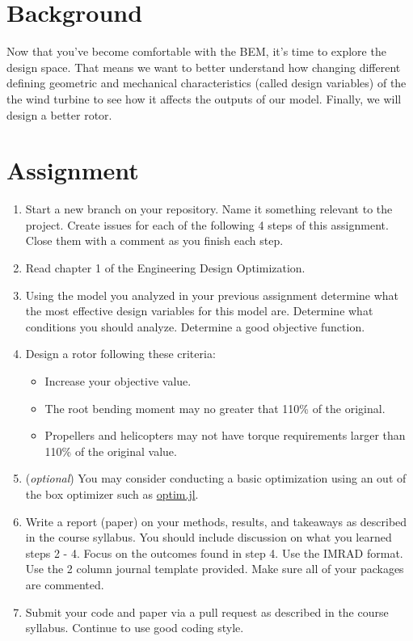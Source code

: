 \documentclass[12pt]{article}
\begin{document}
	
	\section{Background}
	
	Now that you've become comfortable with the BEM, it's time to explore the design space.
That means we want to better understand how changing different defining geometric and mechanical characteristics (called design variables) of the the wind turbine to see how it affects the outputs of our model. 
Finally, we will design a better rotor. 
	
	
	\section{Assignment}

	\begin{enumerate}
		\item Start a new branch on your repository. Name it something relevant to the project. Create issues for each of the following 4 steps of this assignment. Close them with a comment as you finish each step. 
		\item Read chapter 1 of the Engineering Design Optimization. 
		\item Using the model you analyzed in your previous assignment determine what the most effective design variables for this model are. Determine what conditions you should analyze. Determine a good objective function.
		\item Design a rotor following these criteria: 
		\begin{itemize}
			\item Increase your objective value.
			\item The root bending moment may no greater that 110\% of the original. 
			\item Propellers and helicopters may not have torque requirements larger than 110\% of the original value. 
		\end{itemize}
		\item[] (\textit{optional}) You may consider conducting a basic optimization using an out of the box optimizer such as \href{https://github.com/JuliaNLSolvers/Optim.jl}{optim.jl}. 
		\item Write a report (paper) on your methods, results, and takeaways as described in the course syllabus. You should include discussion on what you learned steps 2 - 4.  Focus on the outcomes found in step 4.  Use the IMRAD format. Use the 2 column journal template provided. Make sure all of your packages are commented. 
		\item Submit your code and paper via a pull request as described in the course syllabus. Continue to use good coding style. 
	\end{enumerate}
	
\end{document}
